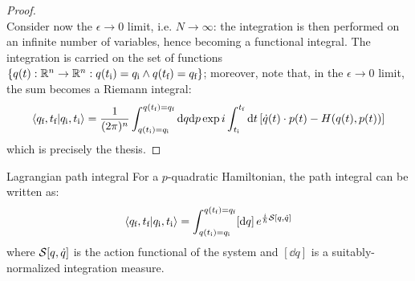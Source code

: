 \begin{proofbox}
\begin{proof}
\begin{equation*}
    \end{equation*}
    Consider now the $ \epsilon \rightarrow 0 $ limit, i.e. $ N \rightarrow \infty $: the integration is then performed on an infinite number of variables, hence becoming a functional integral. The integration is carried on the set of functions $ \{q(t) : \mathbb{R}^n \rightarrow \mathbb{R}^n : q(t_\text{i}) = q_\text{i} \land q(t_\text{f}) = q_\text{f}\} $; moreover, note that, in the $ \epsilon \rightarrow 0 $ limit, the sum becomes a Riemann integral:
    \begin{equation*}
      \braket{q_\text{f},t_\text{f} | q_\text{i},t_\text{i}} = \frac{1}{(2\pi)^n} \int_{q(t_\text{i}) = q_\text{i}}^{q(t_\text{f}) = q_\text{f}} \mathrm{d} q \mathrm{d} p \exp i \int_{t_\text{i}}^{t_\text{f}} \mathrm{d} t \left[ \dot{q}(t) \cdot p(t) - H(q(t),p(t)) \right]
    \end{equation*}
    which is precisely the thesis.
  \end{proof}
\end{proofbox}

\begin{proposition}{Lagrangian path integral}{}
  For a $ p $-quadratic Hamiltonian, the path integral can be written as:
  \begin{equation}
    \braket{q_\text{f},t_\text{f} | q_\text{i},t_\text{i}} = \int_{q(t_\text{i}) = q_\text{i}}^{q(t_\text{f}) = q_\text{f}} [\mathrm{d} q]\, e^{\frac{i}{\hbar} \mathcal{S}[q,\dot{q}]}
    \label{eq:qm-lag-path-int}
  \end{equation}
  where $ \mathcal{S}[q,\dot{q}] $ is the action functional of the system and $ [\dd q] $ is a suitably-normalized integration measure.
\end{proposition}

